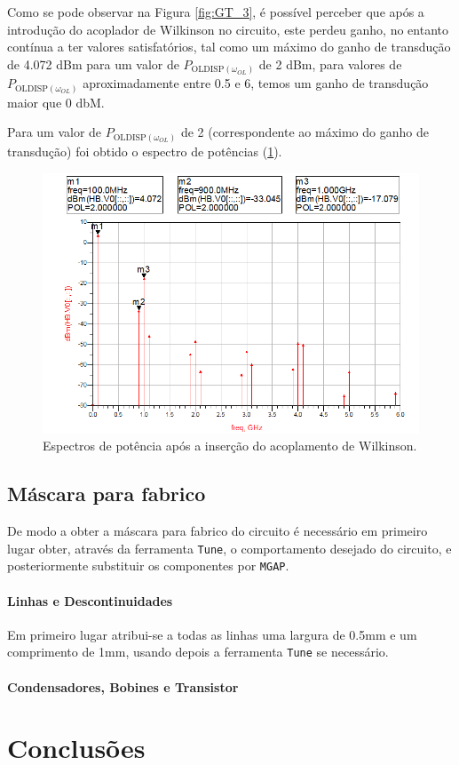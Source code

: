 \documentclass[11pt]{article}
\numberwithin{equation}{section}
\begin{document}
Como se pode observar na Figura \ref{fig:GT_3}, é possível perceber que após a introdução do acoplador de Wilkinson no circuito, este perdeu ganho, no entanto contínua a ter valores satisfatórios, tal como um máximo do ganho de transdução de 4.072 dBm para um valor de $ P_{\text{OLDISP}\left(\omega_{OL}\right)} $ de 2 dBm, para valores de $ P_{\text{OLDISP}\left(\omega_{OL}\right)} $ aproximadamente entre 0.5 e 6, temos um ganho de transdução maior que 0 dbM. 

Para um valor de $ P_{\text{OLDISP}\left(\omega_{OL}\right)} $ de 2 (correspondente ao máximo do ganho de transdução) foi obtido o espectro de potências (\ref{fig:EP_3}).

\begin{figure}[h]
\centering
\includegraphics[keepaspectratio=true, scale=0.45]{exps/EP_3}
\vspace{-0.5em}
\caption{Espectros de potência após a inserção do acoplamento de Wilkinson.}
\vspace{-0.8em}
\label{fig:EP_3}
\end{figure}


\subsection{Máscara para fabrico}

De modo a obter a máscara para fabrico do circuito é necessário em primeiro lugar obter, através da ferramenta \texttt{Tune}, o comportamento desejado do circuito, e posteriormente substituir os componentes por \texttt{MGAP}.

\paragraph{Linhas e Descontinuidades} \hspace{0pt} 

Em primeiro lugar atribui-se a todas as linhas uma largura de 0.5mm e um comprimento de 1mm, usando depois a ferramenta \texttt{Tune} se necessário.



\paragraph{Condensadores, Bobines e Transistor} \hspace{0pt} 

\section{Conclusões}
\end{document}

